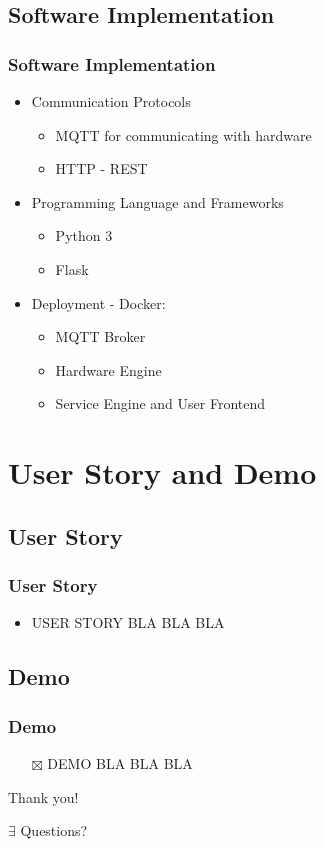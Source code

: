 \documentclass[aspectratio=169]{beamer}
\begin{document}
\subsection{Software Implementation}
\begin{frame}
\frametitle{Software Implementation}
\begin{itemize}
\item Communication Protocols
\begin{itemize}
\item MQTT for communicating with hardware
\item HTTP - REST
\end{itemize}
\item Programming Language and Frameworks
\begin{itemize}
\item Python 3
\item Flask 
\end{itemize}
\item Deployment - Docker:
\begin{itemize}
\item MQTT Broker
\item Hardware Engine
\item Service Engine and User Frontend
\end{itemize}

\end{itemize}
\end{frame}



\section{User Story and Demo}
\subsection{User Story}
\begin{frame}
\frametitle{User Story}
\begin{itemize}
\item USER STORY BLA BLA BLA
\end{itemize}
\end{frame}

\subsection{Demo}
\begin{frame}
\frametitle{Demo}

\begin{itemize}
 \item[$\boxtimes$] DEMO BLA BLA BLA
\end{itemize}
\end{frame}

\begin{frame}
\Huge{\centerline{Thank you!}}
\Huge{\centerline{$\exists$ Questions?}}
\end{frame}
\end{document}
